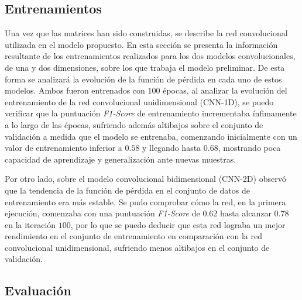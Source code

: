 
\subsection*{Entrenamientos}

Una vez que las matrices han sido construidas, se describe la red convolucional utilizada en el modelo propuesto. En esta sección se presenta la información resultante de los entrenamientos realizados para los dos modelos convolucionales, de una y dos dimensiones, sobre los que trabaja el modelo preliminar. De esta forma se analizará la evolución de la función de pérdida en cada uno de estos modelos. Ambos fueron entrenados con $100$ épocas, al analizar la evolución del entrenamiento de la red convolucional unidimensional (CNN-1D), se puedo verificar que la puntuación \textit{F1-Score} de entrenamiento incrementaba ínfimamente a lo largo de las épocas, sufriendo además altibajos sobre el conjunto de validación a medida que el modelo se entrenaba, comenzando inicialmente con un valor de entrenamiento inferior a $0.58$ y llegando hasta $0.68$, mostrando poca capacidad de aprendizaje y generalización ante nuevas muestras.

Por otro lado, sobre el modelo convolucional bidimensional (CNN-2D) observó que la tendencia de la función de pérdida en el conjunto de datos de entrenamiento era más estable. Se pudo comprobar cómo la red, en la primera ejecución, comenzaba con una puntuación \textit{F1-Score} de $0.62$ hasta alcanzar $0.78$ en la iteración $100$, por lo que se puedo deducir que esta red lograba un mejor rendimiento en el conjunto de entrenamiento en comparación con la red convolucional unidimensional, sufriendo menos altibajos en el conjunto de validación.


\subsection*{Evaluación}


